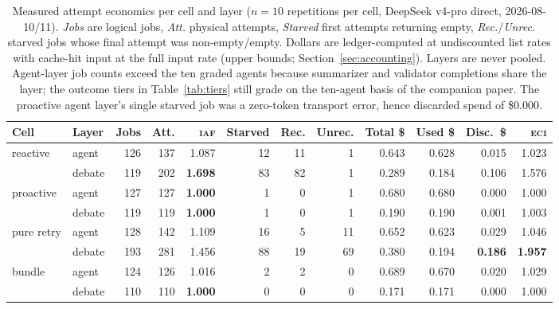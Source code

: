 \documentclass[11pt]{article}
\newcommand{\iaf}{\textsc{iaf}}
\newcommand{\eci}{\textsc{eci}}
\begin{document}
\begin{table}[!htb]
\centering\small
\setlength{\tabcolsep}{4.5pt}
\begin{tabular}{llrrrrrrrrrr}
\toprule
Cell & Layer & Jobs & Att. & \iaf{} & Starved & Rec. & Unrec. &
Total \$ & Used \$ & Disc.\ \$ & \eci{} \\
\midrule
reactive & agent & 126 & 137 & 1.087 & 12 & 11 & 1 & 0.643 & 0.628 & 0.015 & 1.023 \\
 & debate & 119 & 202 & \textbf{1.698} & 83 & 82 & 1 & 0.289 & 0.184 & 0.106 & 1.576 \\
\addlinespace
proactive & agent & 127 & 127 & \textbf{1.000} & 1 & 0 & 1 & 0.680 & 0.680 & 0.000 & 1.000 \\
 & debate & 119 & 119 & \textbf{1.000} & 1 & 0 & 1 & 0.190 & 0.190 & 0.001 & 1.003 \\
\addlinespace
pure retry & agent & 128 & 142 & 1.109 & 16 & 5 & 11 & 0.652 & 0.623 & 0.029 & 1.046 \\
 & debate & 193 & 281 & 1.456 & 88 & 19 & 69 & 0.380 & 0.194 & \textbf{0.186} & \textbf{1.957} \\
\addlinespace
bundle & agent & 124 & 126 & 1.016 & 2 & 2 & 0 & 0.689 & 0.670 & 0.020 & 1.029 \\
 & debate & 110 & 110 & \textbf{1.000} & 0 & 0 & 0 & 0.171 & 0.171 & 0.000 & 1.000 \\
\bottomrule
\end{tabular}
\caption{Measured attempt economics per cell and layer ($n{=}10$
repetitions per cell, DeepSeek v4-pro direct, 2026-08-10/11).
\emph{Jobs} are logical jobs, \emph{Att.} physical attempts,
\emph{Starved} first attempts returning empty, \emph{Rec.}/\emph{Unrec.}
starved jobs whose final attempt was non-empty/empty. Dollars are
ledger-computed at undiscounted list rates with cache-hit input at the
full input rate (upper bounds; Section~\ref{sec:accounting}). Layers
are never pooled. Agent-layer job counts exceed the ten graded agents
because summarizer and validator completions share the layer; the
outcome tiers in Table~\ref{tab:tiers} still grade on the ten-agent
basis of the companion paper. The proactive agent layer's single
starved job was a zero-token transport error, hence discarded spend of
\$0.000.}
\label{tab:main}
\end{table}
\end{document}
